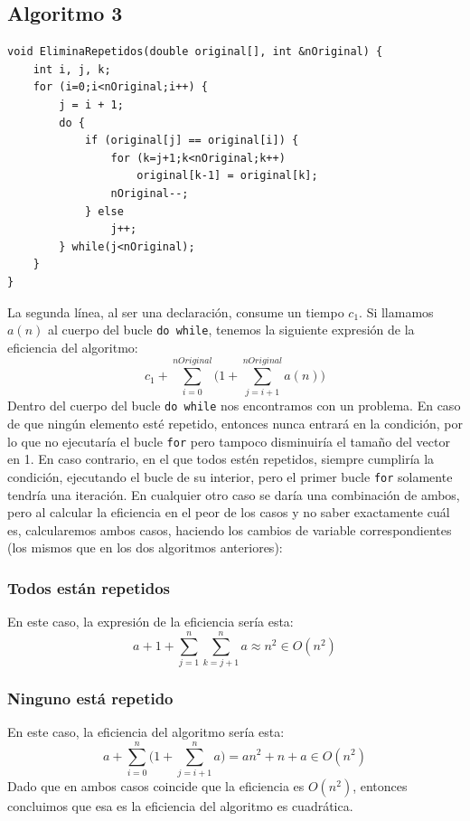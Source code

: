 \documentclass[11pt,twoside,titlepage,a4paper]{article}
\begin{document}
\subsection{Algoritmo 3}

\begin{lstlisting}
void EliminaRepetidos(double original[], int &nOriginal) {
	int i, j, k;
	for (i=0;i<nOriginal;i++) {
		j = i + 1;
		do {
			if (original[j] == original[i]) {
				for (k=j+1;k<nOriginal;k++)
					original[k-1] = original[k];
				nOriginal--;
			} else
				j++;
		} while(j<nOriginal);
	}
}
\end{lstlisting}
La segunda línea, al ser una declaración, consume un tiempo $c_1$. Si llamamos $a(n)$ al cuerpo del bucle 
\texttt{do while}, tenemos la siguiente expresión de la eficiencia del algoritmo:
\begin{equation*}
c_1 + \sum_{i=0}^{nOriginal}\Big(1+\sum_{j=i+1}^{nOriginal}a(n)\Big)
\end{equation*}
Dentro del cuerpo del bucle \texttt{do while} nos encontramos con un problema. En caso de que ningún
elemento esté repetido, entonces nunca entrará en la condición, por lo que no ejecutaría el bucle 
\texttt{for} pero tampoco disminuiría el tamaño del vector en 1. En caso contrario, en el que todos estén
repetidos, siempre cumpliría la condición, ejecutando el bucle de su interior, pero el primer bucle 
\texttt{for} solamente tendría una iteración. En cualquier otro caso se daría una combinación de ambos,
pero al calcular la eficiencia en el peor de los casos y no saber exactamente cuál es, calcularemos ambos 
casos, haciendo los cambios de variable correspondientes (los mismos que en los dos algoritmos anteriores):
\subsubsection*{Todos están repetidos}
En este caso, la expresión de la eficiencia sería esta:
\begin{equation*}
a + 1 + \sum_{j=1}^{n}\sum_{k=j+1}^{n}a \approx n^2 \in O(n^2)
\end{equation*}
\subsubsection*{Ninguno está repetido}
En este caso, la eficiencia del algoritmo sería esta:
\begin{equation*}
a + \sum_{i=0}^{n}\Big(1+\sum_{j=i+1}^{n}a\Big) = an^2+n+a \in O(n^2)
\end{equation*}
Dado que en ambos casos coincide que la eficiencia es $O(n^2)$, entonces concluimos que esa
es la eficiencia del algoritmo es cuadrática.
\clearpage
\end{document}
